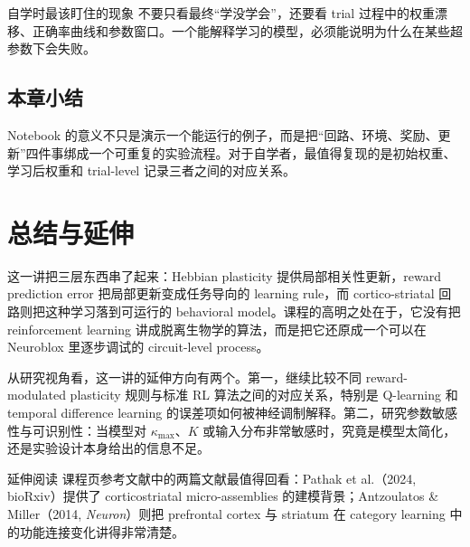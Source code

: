 \documentclass[a4paper]{article}
\begin{document}
\begin{importantbox}{自学时最该盯住的现象}
不要只看最终“学没学会”，还要看 trial 过程中的权重漂移、正确率曲线和参数窗口。一个能解释学习的模型，必须能说明为什么在某些超参数下会失败。
\end{importantbox}

\subsection{本章小结}
Notebook 的意义不只是演示一个能运行的例子，而是把“回路、环境、奖励、更新”四件事绑成一个可重复的实验流程。对于自学者，最值得复现的是初始权重、学习后权重和 trial-level 记录三者之间的对应关系。

\section{总结与延伸}
这一讲把三层东西串了起来：Hebbian plasticity 提供局部相关性更新，reward prediction error 把局部更新变成任务导向的 learning rule，而 cortico-striatal 回路则把这种学习落到可运行的 behavioral model。课程的高明之处在于，它没有把 reinforcement learning 讲成脱离生物学的算法，而是把它还原成一个可以在 Neuroblox 里逐步调试的 circuit-level process。

从研究视角看，这一讲的延伸方向有两个。第一，继续比较不同 reward-modulated plasticity 规则与标准 RL 算法之间的对应关系，特别是 Q-learning 和 temporal difference learning 的误差项如何被神经调制解释。第二，研究参数敏感性与可识别性：当模型对 $\kappa_{\max}$、$K$ 或输入分布非常敏感时，究竟是模型太简化，还是实验设计本身给出的信息不足。

\begin{importantbox}{延伸阅读}
课程页参考文献中的两篇文献最值得回看：Pathak et al.（2024, bioRxiv）提供了 corticostriatal micro-assemblies 的建模背景；Antzoulatos \& Miller（2014, \emph{Neuron}）则把 prefrontal cortex 与 striatum 在 category learning 中的功能连接变化讲得非常清楚。
\end{importantbox}
\end{document}
